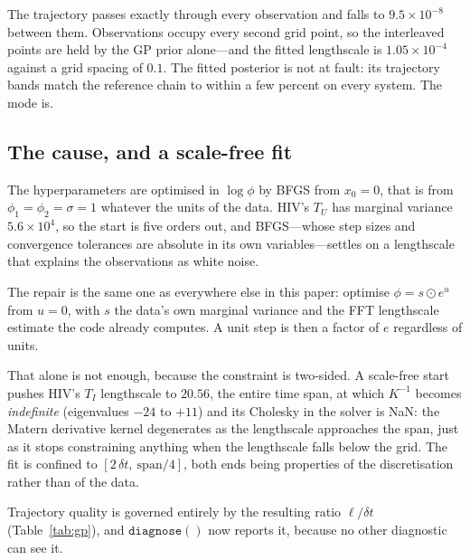 \documentclass[11pt]{article}
\theoremstyle{plain}
\theoremstyle{definition}
\theoremstyle{remark}
\begin{document}
The trajectory passes exactly through every observation and falls to $9.5\times10^{-8}$ between
them. Observations occupy every second grid point, so the interleaved points are held by the GP
prior alone---and the fitted lengthscale is $1.05\times10^{-4}$ against a grid spacing of $0.1$.
The fitted posterior is not at fault: its trajectory bands match the reference chain to within a
few percent on every system. The mode is.

\subsection{The cause, and a scale-free fit}

The hyperparameters are optimised in $\log\phi$ by BFGS from $x_0 = 0$, that is from
$\phi_1 = \phi_2 = \sigma = 1$ whatever the units of the data. HIV's $T_U$ has marginal variance
$5.6\times10^4$, so the start is five orders out, and BFGS---whose step sizes and convergence
tolerances are absolute in its own variables---settles on a lengthscale that explains the
observations as white noise.

The repair is the same one as everywhere else in this paper: optimise
$\phi = s \odot e^{u}$ from $u = 0$, with $s$ the data's own marginal variance and the FFT
lengthscale estimate the code already computes. A unit step is then a factor of $e$ regardless of
units.

That alone is not enough, because the constraint is two-sided. A scale-free start pushes HIV's
$T_I$ lengthscale to $20.56$, the entire time span, at which $K^{-1}$ becomes \emph{indefinite}
(eigenvalues $-24$ to $+11$) and its Cholesky in the solver is NaN: the Matern derivative kernel
degenerates as the lengthscale approaches the span, just as it stops constraining anything when
the lengthscale falls below the grid. The fit is confined to $[2\,\delta t,\ \mathrm{span}/4]$,
both ends being properties of the discretisation rather than of the data.

Trajectory quality is governed entirely by the resulting ratio $\ell/\delta t$
(Table~\ref{tab:gp}), and $\mathtt{diagnose()}$ now reports it, because no other diagnostic can
see it.
\end{document}
